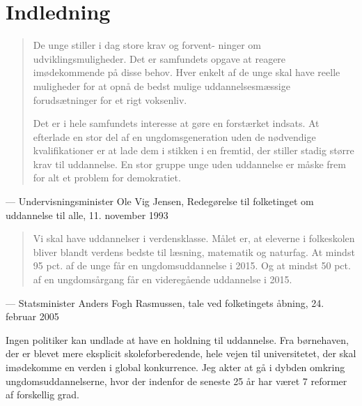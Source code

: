 \section{Indledning}
\begin{quotation}
De unge stiller i dag store krav og forvent- ninger om udviklingsmuligheder.
Det er samfundets opgave at reagere imødekommende på disse behov.
Hver enkelt af de unge skal have
reelle muligheder for at opnå de bedst mulige uddannelsesmæssige forudsætninger for et rigt voksenliv.

Det er i hele samfundets interesse at gøre en forstærket indsats.
At efterlade en stor del af en ungdomsgeneration uden de nødvendige kvalifikationer er at lade dem i stikken i en fremtid, der stiller stadig større krav til uddannelse.
En stor gruppe unge uden uddannelse er måske frem for alt et problem for demokratiet.
\end{quotation}
--- Undervisningsminister Ole Vig Jensen, Redegørelse til folketinget om uddannelse til alle, 11. november 1993

\begin{quotation}
Vi skal have uddannelser i verdensklasse. Målet er, at eleverne i folkeskolen bliver blandt verdens bedste til læsning, matematik og naturfag. At mindst 95 pct. af de unge får en ungdomsuddannelse i 2015. Og at mindst 50 pct. af en ungdomsårgang får en videregående uddannelse i 2015.
\end{quotation}
--- Statsminister Anders Fogh Rasmussen, tale ved folketingets åbning, 24. februar 2005



Ingen politiker kan undlade at have en holdning til uddannelse.
Fra børnehaven, der er blevet mere eksplicit skoleforberedende, hele vejen til universitetet, der skal imødekomme en verden i global konkurrence.
Jeg akter at gå i dybden omkring ungdomsuddannelserne, hvor der indenfor de seneste 25 år har været 7 reformer af forskellig grad.

